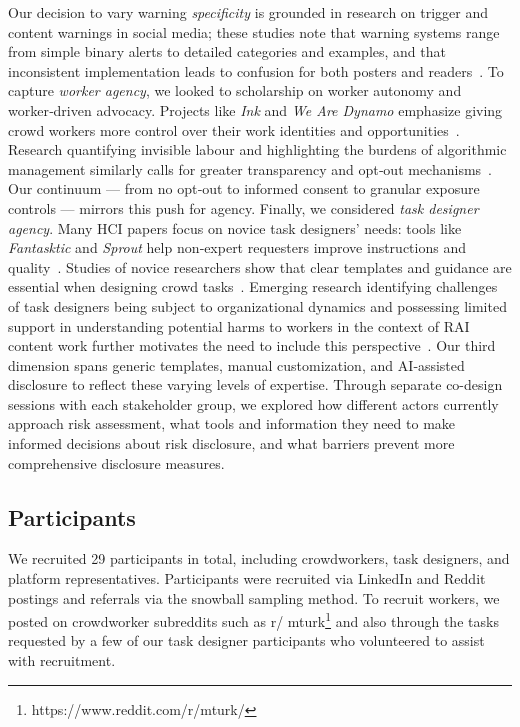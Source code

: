 Our decision to vary warning \emph{specificity} is grounded in research on trigger and content warnings in social media; these studies note that warning systems range from simple binary alerts to detailed categories and examples, and that inconsistent implementation leads to confusion for both posters and readers~\cite{Zhang2024PerceptionsTriggerWarnings, bridgland2024meta}. To capture \emph{worker agency}, we looked to scholarship on worker autonomy and worker‑driven advocacy. Projects like \emph{Ink} and \emph{We Are Dynamo} emphasize giving crowd workers more control over their work identities and opportunities~\cite{salehi2018ink,salehi2015we}. Research quantifying invisible labour and highlighting the burdens of algorithmic management similarly calls for greater transparency and opt‑out mechanisms~\cite{toxtli2021quantifying}. Our continuum --- from no opt‑out to informed consent to granular exposure controls --- mirrors this push for agency. Finally, we considered \emph{task designer agency}. Many HCI papers focus on novice task designers’ needs: tools like \emph{Fantasktic} and \emph{Sprout} help non‑expert requesters improve instructions and quality~\cite{gutheim2012fantasktic,bragg2018sprout}. Studies of novice researchers show that clear templates and guidance are essential when designing crowd tasks~\cite{papoutsaki2015crowdsourcing}. Emerging research identifying challenges of task designers being subject to organizational dynamics and possessing limited support in understanding potential harms to workers in the context of RAI content work further motivates the need to include this perspective~\cite{qian2025locating}. Our third dimension spans generic templates, manual customization, and AI‑assisted disclosure to reflect these varying levels of expertise. Through separate co-design sessions with each stakeholder group, we explored how different actors currently approach risk assessment, what tools and information they need to make informed decisions about risk disclosure, and what barriers prevent more comprehensive disclosure measures. 





\subsection{Participants}
We recruited 29 participants in total, including crowdworkers, task designers, and platform representatives. Participants were recruited via LinkedIn and Reddit postings and referrals via the snowball sampling method. To recruit workers, we posted on crowdworker subreddits such as r\slash
mturk\footnote{https://www.reddit.com/r/mturk/} and also through the tasks requested by a few of our task designer participants who volunteered to assist with recruitment. 

